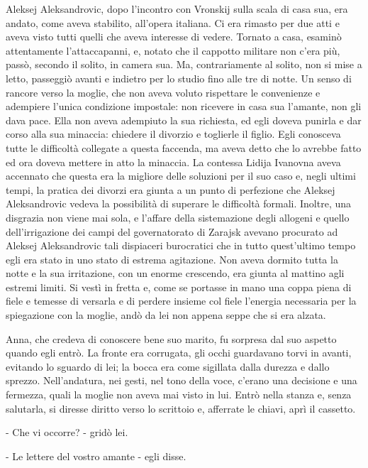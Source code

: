 Aleksej Aleksandrovic, dopo l'incontro con Vronskij sulla scala di casa sua, era andato, come aveva stabilito, all'opera italiana. Ci era rimasto per due atti e aveva visto tutti quelli che aveva interesse di vedere. Tornato a casa, esaminò attentamente l'attaccapanni, e, notato che il cappotto militare non c'era più, passò, secondo il solito, in camera sua. Ma, contrariamente al solito, non si mise a letto, passeggiò avanti e indietro per lo studio fino alle tre di notte. Un senso di rancore verso la moglie, che non aveva voluto rispettare le convenienze e adempiere l'unica condizione impostale: non ricevere in casa sua l'amante, non gli dava pace. Ella non aveva adempiuto la sua richiesta, ed egli doveva punirla e dar corso alla sua minaccia: chiedere il divorzio e toglierle il figlio. Egli conosceva tutte le difficoltà collegate a questa faccenda, ma aveva detto che lo avrebbe fatto ed ora doveva mettere in atto la minaccia. La contessa Lidija Ivanovna aveva accennato che questa era la migliore delle soluzioni per il suo caso e, negli ultimi tempi, la pratica dei divorzi era giunta a un punto di perfezione che Aleksej Aleksandrovic vedeva la possibilità di superare le difficoltà formali. Inoltre, una disgrazia non viene mai sola, e l'affare della sistemazione degli allogeni e quello dell'irrigazione dei campi del governatorato di Zarajsk avevano procurato ad Aleksej Aleksandrovic tali dispiaceri burocratici che in tutto quest'ultimo tempo egli era stato in uno stato di estrema agitazione. Non aveva dormito tutta la notte e la sua irritazione, con un enorme crescendo, era giunta al mattino agli estremi limiti. Si vestì in fretta e, come se portasse in mano una coppa piena di fiele e temesse di versarla e di perdere insieme col fiele l'energia necessaria per la spiegazione con la moglie, andò da lei non appena seppe che si era alzata. 

Anna, che credeva di conoscere bene suo marito, fu sorpresa dal suo aspetto quando egli entrò. La fronte era corrugata, gli occhi guardavano torvi in avanti, evitando lo sguardo di lei; la bocca era come sigillata dalla durezza e dallo sprezzo. Nell'andatura, nei gesti, nel tono della voce, c'erano una decisione e una fermezza, quali la moglie non aveva mai visto in lui. Entrò nella stanza e, senza salutarla, si diresse diritto verso lo scrittoio e, afferrate le chiavi, aprì il cassetto. 

- Che vi occorre? - gridò lei. 

- Le lettere del vostro amante - egli disse. 

